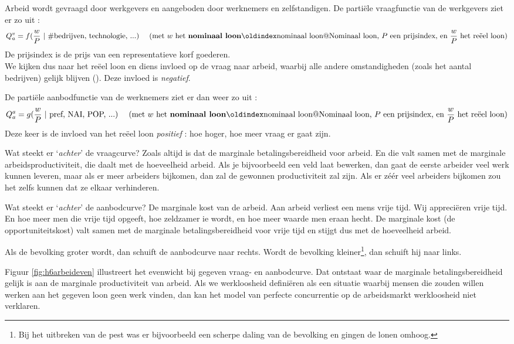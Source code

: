Arbeid wordt gevraagd door werkgevers en aangeboden door werknemers en zelfstandigen. De parti\"ele vraagfunctie van de werkgevers ziet er zo uit :
$$Q_a^v=f(\frac{w}{P}\ |\ \text{\#bedrijven, technologie, ...})\quad\text{ (met }w\text{ het \term{nominaal loon}, }P\text{ een prijsindex, en }\frac{w}{P}\text{ het re\"eel loon)}$$
De prijsindex is de prijs van een representatieve korf goederen. \\
We kijken dus naar het re\"eel loon en diens invloed op de vraag naar arbeid, waarbij alle andere omstandigheden (zoals het aantal bedrijven) gelijk blijven (). Deze invloed is \textit{negatief}.

\par\noindent De parti\"ele aanbodfunctie van de werknemers ziet er dan weer zo uit :
$$Q_a^a=g(\frac{w}{P}\ |\ \text{pref, NAI, POP, ...})\quad\text{ (met }w\text{ het \term{nominaal loon}, }P\text{ een prijsindex, en }\frac{w}{P}\text{ het re\"eel loon)}$$
Deze keer is de invloed van het re\"eel loon \textit{positief} : hoe hoger, hoe meer vraag er gaat zijn.\\

\par Wat steekt er `\textit{achter}' de vraagcurve? Zoals altijd is dat de marginale betalingsbereidheid voor arbeid. En die valt samen met de marginale arbeidsproductiviteit, die daalt met de hoeveelheid arbeid. Als je bijvoorbeeld een veld laat bewerken, dan gaat de eerste arbeider veel werk kunnen leveren, maar als er meer arbeiders bijkomen, dan zal de gewonnen productiviteit zal zijn. Als er z\'e\'er veel arbeiders bijkomen zou het zelfs kunnen dat ze elkaar verhinderen.
\par Wat steekt er `\textit{achter}' de aanbodcurve? De marginale kost van de arbeid. Aan arbeid verliest een mens vrije tijd. Wij appreci\"eren vrije tijd. En hoe meer men die vrije tijd opgeeft, hoe zeldzamer ie wordt, en hoe meer waarde men eraan hecht. De marginale kost (de opportuniteitskost) valt samen met de marginale betalingsbereidheid voor vrije tijd en stijgt dus met de hoeveelheid arbeid.
\par Als de bevolking groter wordt, dan schuift de aanbodcurve naar rechts. Wordt de bevolking kleiner\footnote{Bij het uitbreken van de pest was er bijvoorbeeld een scherpe daling van de bevolking en gingen de lonen omhoog.}, dan schuift hij naar links.\\

\par Figuur \ref{fig:h6arbeideven} illustreert het evenwicht bij gegeven vraag- en aanbodcurve. Dat ontstaat waar de marginale betalingsbereidheid gelijk is aan de marginale productiviteit van arbeid. Als we werkloosheid defini\"eren als een situatie waarbij mensen die zouden willen werken aan het gegeven loon geen werk vinden, dan kan het model van perfecte concurrentie op de arbeidsmarkt werkloosheid niet verklaren.

